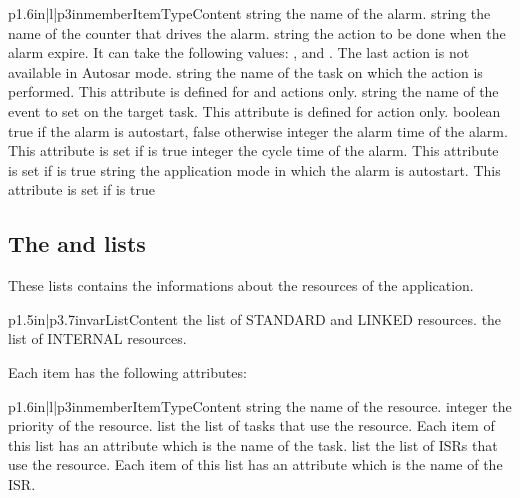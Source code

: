 \begin{longtableiii}{p{1.6in}|l|p{3in}}{member}{Item}{Type}{Content}
  {string}
  {the name of the alarm.}
  {string}
  {the name of the counter that drives the alarm.}
  {string}
  {the action to be done when the alarm expire. It can take the following values: ,  and . The last action is not available in Autosar mode.}
  {string}
  {the name of the task on which the action is performed. This attribute is defined for  and  actions only.}
  {string}
  {the name of the event to set on the target task. This attribute is defined for  action only.}
  {boolean}
  {true if the alarm is autostart, false otherwise}
  {integer}
  {the alarm time of the alarm. This attribute is set if  is true}
  {integer}
  {the cycle time of the alarm. This attribute is set if  is true}
  {string}
  {the application mode in which the alarm is autostart. This attribute is set if  is true}
\end{longtableiii}

\subsection{The  and  lists}

These lists contains the informations about the resources of the application.

\begin{longtableii}{p{1.5in}|p{3.7in}}{var}{List}{Content}
  {the list of STANDARD and LINKED resources.}
  {the list of INTERNAL resources.}
\end{longtableii}

Each item has the following attributes:

\begin{longtableiii}{p{1.6in}|l|p{3in}}{member}{Item}{Type}{Content}
  {string}
  {the name of the resource.}
  {integer}
  {the priority of the resource.}
  {list}
  {the list of tasks that use the resource. Each item of this list has an attribute  which is the name of the task.}
  {list}
  {the list of ISRs that use the resource. Each item of this list has an attribute  which is the name of the ISR.}
\end{longtableiii}

